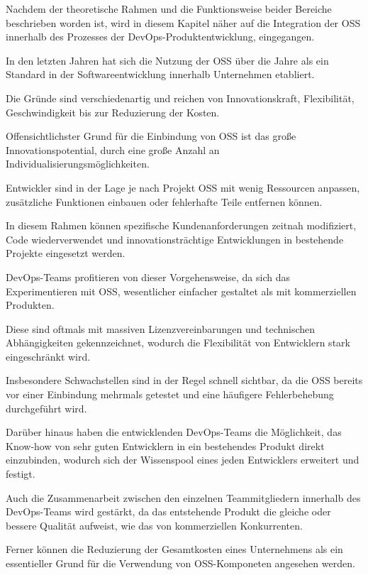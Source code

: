 Nachdem der theoretische Rahmen und die Funktionsweise beider Bereiche beschrieben worden ist, wird in diesem Kapitel näher auf die Integration der OSS innerhalb des Prozesses der DevOps-Produktentwicklung, eingegangen.

In den letzten Jahren hat sich die Nutzung der OSS über die Jahre  als ein Standard in der Softwareentwicklung innerhalb Unternehmen etabliert. 

Die Gründe sind verschiedenartig und reichen von Innovationskraft, Flexibilität, Geschwindigkeit bis zur Reduzierung der Kosten.

Offensichtlichster Grund für die Einbindung von OSS ist das große Innovationspotential, durch eine große Anzahl an Individualisierungsmöglichkeiten. 

Entwickler sind in der Lage je nach Projekt OSS mit wenig Ressourcen anpassen, zusätzliche Funktionen einbauen oder fehlerhafte Teile entfernen können. 

In diesem Rahmen können spezifische Kundenanforderungen zeitnah modifiziert, Code wiederverwendet und innovationsträchtige Entwicklungen in bestehende Projekte eingesetzt werden.

DevOps-Teams profitieren von dieser Vorgehensweise, da sich das Experimentieren mit OSS, wesentlicher einfacher gestaltet als mit kommerziellen Produkten.   

Diese sind oftmals mit massiven Lizenzvereinbarungen und technischen Abhängigkeiten gekennzeichnet, wodurch die Flexibilität von Entwicklern stark eingeschränkt wird. 

Insbesondere Schwachstellen sind in der Regel schnell sichtbar, da die OSS bereits vor einer Einbindung mehrmals getestet und eine häufigere Fehlerbehebung durchgeführt wird.

Darüber hinaus haben die entwicklenden DevOps-Teams die Möglichkeit, das Know-how von sehr guten Entwicklern in ein bestehendes Produkt direkt einzubinden, wodurch sich der Wissenspool eines jeden Entwicklers erweitert und festigt. 

Auch die Zusammenarbeit zwischen den einzelnen Teammitgliedern innerhalb des DevOps-Teams wird gestärkt, da das entstehende Produkt die gleiche oder bessere Qualität aufweist, wie das von kommerziellen Konkurrenten. 

Ferner können die Reduzierung der Gesamtkosten eines Unternehmens als ein essentieller Grund für die Verwendung von OSS-Komponeten angesehen werden. 

